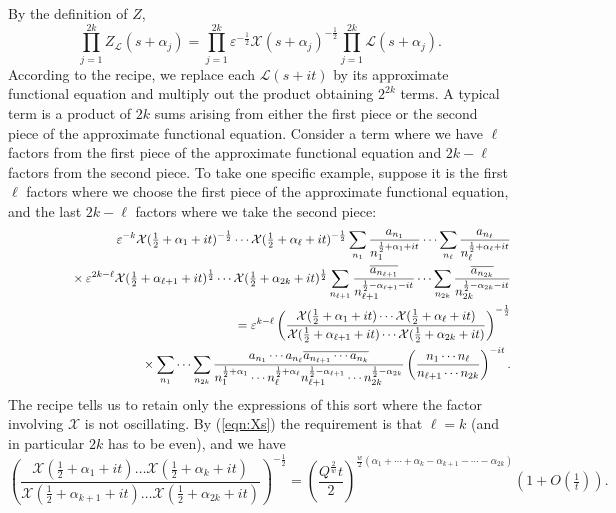 \documentclass[12pt,letterpaper]{amsart}
\theoremstyle{plain}
\theoremstyle{definition}
\theoremstyle{remark}
\numberwithin{equation}{subsection}
\numberwithin{theorem}{subsection}
\numberwithin{table}{subsection}
\begin{document}
By the definition of $Z$,
\begin{equation}
\prod_{j=1}^{2k}Z_\mathcal{L}(s+\alpha_j)=
\prod_{j=1}^{2k}\varepsilon^{-\frac 12}
\mathcal{X}(s+\alpha_j)^{-\frac 12 } \prod_{j=1}^{2k}
\mathcal{L}(s+\alpha_j) .
\end{equation}
According to the recipe, we replace each $\mathcal{L}(s+it)$ by its 
approximate functional
equation and multiply out the product obtaining $2^{2k}$ terms.
A typical term is a product of $2k$ sums arising from either the first
piece or the second piece of the approximate functional equation.
Consider a term where we have $\ell$ factors from the first
piece of the approximate functional equation and $2k-\ell$ factors from the
second piece.  To take one specific example, suppose it is the  first $\ell$
factors where we choose the first piece of the approximate functional equation,
and the last $2k-\ell$ factors where we take the second piece: 
\begin{eqnarray} \label{eqn:generalfirstterm}
&   &  \varepsilon^{- k }
\mathcal{X}(\tfrac 12 +\alpha_1+it)^{-\frac 12}\cdots 
      \mathcal{X}(\tfrac 12 +\alpha_{\ell}+it)^{-\frac 12}
\sum_{n_1}\frac {a_{n_1}}{n_1^{\frac 12 +\alpha_1+it}}
            \cdots \sum_{n_\ell}\frac {a_{n_\ell}}{n_\ell^{\frac 12 +\alpha_\ell+it}} \nonumber \\
&   &\phantom{xxxxxxx} \times \varepsilon^{2k-\ell} 
  \mathcal{X}(\tfrac 12 +\alpha_{\ell+1}+it)^{\frac12}
\cdots \mathcal{X}(\tfrac 12 +\alpha_{2k}+it)^{\frac12}
  \sum_{n_{\ell+1}}\frac {\overline{a_{n_{\ell+1}}}}{n_{\ell+1}^{\frac 12
-\alpha_{\ell+1}-it}} \cdots \sum_{n_{2k}}\frac
{\overline{a_{n_{2k}}}}{n_{2k}^{\frac 12 -\alpha_{2k}-it}}  \cr
& & \phantom{XX} = 
\varepsilon^{ k -\ell}
\left(\frac{\mathcal{X}(\tfrac 12 +\alpha_1+it)\cdots \mathcal{X}(\frac
12 +\alpha_\ell+it)} {\mathcal{X}(\tfrac 12 +\alpha_{\ell+1}+it)\cdots
\mathcal{X}(\tfrac 12 +\alpha_{2k}+it)}\right)^{-\frac 12}
\nonumber \\
&   &\phantom{XXxxxxxxx} \times 
\sum_{n_1}\cdots \sum_{n_{2k}} 
        \frac{a_{n_1}\cdots a_{n_\ell}\overline{a_{n_{\ell+1}}\cdots 
           a_{n_k}}}
{n_1^{\frac12 +\alpha_1}\cdots n_\ell^{\frac12 +\alpha_\ell} 
n_{\ell+1}^{\frac12 -\alpha_{\ell+1}} \cdots n_{2k}^{\frac 12-\alpha_{2k}}}
 \left(\frac{n_1 \cdots n_\ell}{n_{\ell+1}\cdots n_{2k}}\right)^{-it}.
\end{eqnarray}
The recipe tells us to retain only the expressions of this sort where the 
factor involving  $\mathcal{X}$ is not oscillating.
By (\ref{eqn:Xs}) the requirement is that $\ell=k$
(and in particular $2k$ has to be even),
and we have
\begin{equation}
\left(\frac{\mathcal{X}(\tfrac 12 +\alpha_1+it)\dots \mathcal{X}(\tfrac 12
+\alpha_k+it)} {\mathcal{X}(\tfrac 12 +\alpha_{k+1}+it)\dots \mathcal{X}(\tfrac
12 +\alpha_{2k}+it)}\right)^{-\frac 12}
=
\left( \frac{Q^{\frac 2w}t}{2}
\right)^{\frac{w}{2}(\alpha _1+\cdots
 +\alpha _k-\alpha _{k+1}-\cdots -\alpha _{2k})}(1+O(\tfrac1t))
.
\end{equation}
\end{document}
